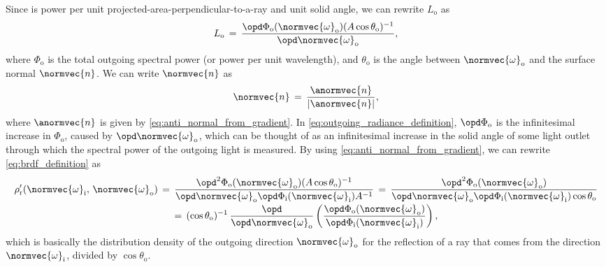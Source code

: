 Since \radiance is power per unit projected-area-perpendicular-to-a-ray and unit solid angle, we can rewrite $L_{\text{o}}$ as
%
\begin{equation} \label{eq:outgoing_radiance_definition}
L_{\text{o}} \,=\, \frac{\opd \Phi_{\text{o}}(\normvec{\omega}_{\text{o}})(A\cos\theta_{\text{o}})^{-1}}{\opd \normvec{\omega}_{\text{o}}},
\end{equation}
%
where $\Phi_{\text{o}}$ is the total outgoing spectral power (or power per unit wavelength), and $\theta_{\text{o}}$ is the angle between $\normvec{\omega}_{\text{o}}$ and the surface normal $\normvec{n}$. We can write $\normvec{n}$ as
%
\begin{equation} \label{eq:normal_from_antinormal}
\normvec{n} \,=\, \frac{\anormvec{n}}{|\anormvec{n}|},
\end{equation}
%
where $\anormvec{n}$ is given by \eqref{eq:anti_normal_from_gradient}. In \eqref{eq:outgoing_radiance_definition}, $\opd \Phi_{\text{o}}$ is the infinitesimal increase in $\Phi_{\text{o}}$, caused by $\opd \normvec{\omega}_{\text{o}}$, which can be thought of as an infinitesimal increase in the solid angle of some light outlet through which the spectral power of the outgoing light is measured. By using \eqref{eq:anti_normal_from_gradient}, we can rewrite \eqref{eq:brdf_definition} as
%
\begin{equation} \label{eq:brdf_rewritten}
\renewcommand*{\arraystretch}{2}
\begin{array}{c}
\displaystyle \rho'_{\text{r}}(\normvec{\omega}_{\text{i}},\, \normvec{\omega}_{\text{o}}) \,=\, \frac{\opd^2 \Phi_{\text{o}}(\normvec{\omega}_{\text{o}})(A\cos\theta_{\text{o}})^{-1}}{\opd \normvec{\omega}_{\text{o}}\opd \Phi_{\text{i}}(\normvec{\omega}_{\text{i}})A^{-1}} \,=\, \frac{\opd^2 \Phi_{\text{o}}(\normvec{\omega}_{\text{o}})}{\opd \normvec{\omega}_{\text{o}}\opd \Phi_{\text{i}}(\normvec{\omega}_{\text{i}})\cos\theta_{\text{o}}} \\
\displaystyle =\, (\cos\theta_{\text{o}})^{-1}\, \frac{\opd}{\opd \normvec{\omega}_{\text{o}}}\left(\frac{\opd \Phi_{\text{o}}(\normvec{\omega}_{\text{o}})}{\opd \Phi_{\text{i}}(\normvec{\omega}_{\text{i}})}\right),
\end{array}
\end{equation}
%
which is basically the distribution density of the outgoing direction $\normvec{\omega}_{\text{o}}$ for the reflection of a ray that comes from the direction $\normvec{\omega}_{\text{i}}$, divided by $\cos\theta_{\text{o}}$.

